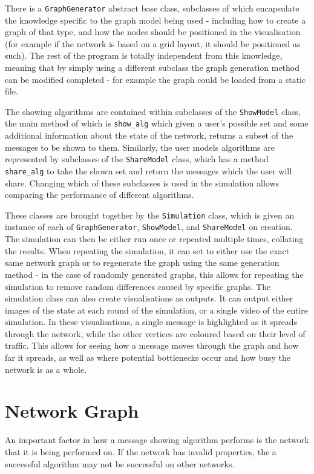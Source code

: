 \documentclass[bsc,frontabs,twoside,singlespacing,parskip,deptreport]{infthesis}     %
\begin{document}
There is a \texttt{GraphGenerator} abstract base class, subclasses of which encapsulate the knowledge specific to the graph model being used - including how to create a graph of that type, and how the nodes should be positioned in the visualisation (for example if the network is based on a grid layout, it should be positioned as such). The rest of the program is totally independent from this knowledge, meaning that by simply using a different subclass the graph generation method can be modified completed - for example the graph could be loaded from a static file.

The showing algorithms are contained within subclasses of the \texttt{ShowModel} class, the main method of which is \texttt{show\_alg} which given a user's possible set and some additional information about the state of the network, returns a subset of the messages to be shown to them. Similarly, the user models algorithms are represented by subclasses of the \texttt{ShareModel} class, which has a method \texttt{share\_alg} to take the shown set and return the messages which the user will share. Changing which of these subclasses is used in the simulation allows comparing the performance of different algorithms.

These classes are brought together by the \texttt{Simulation} class, which is given an instance of each of \texttt{GraphGenerator}, \texttt{ShowModel}, and \texttt{ShareModel} on creation. The simulation can then be either run once or repeated multiple times, collating the results. When repeating the simulation, it can set to either use the exact same network graph or to regenerate the graph using the same generation method - in the case of randomly generated graphs, this allows for repeating the simulation to remove random differences caused by specific graphs. The simulation class can also create visualisations as outputs. It can output either images of the state at each round of the simulation, or a single video of the entire simulation. In these visualisations, a single message is highlighted as it spreads through the network, while the other vertices are coloured based on their level of traffic. This allows for seeing how a message moves through the graph and how far it spreads, as well as where potential bottlenecks occur and how busy the network is as a whole.

\section{Network Graph}
An important factor in how a message showing algorithm performs is the network that it is being performed on. If the network has invalid properties, the a successful algorithm may not be successful on other networks.
\end{document}
